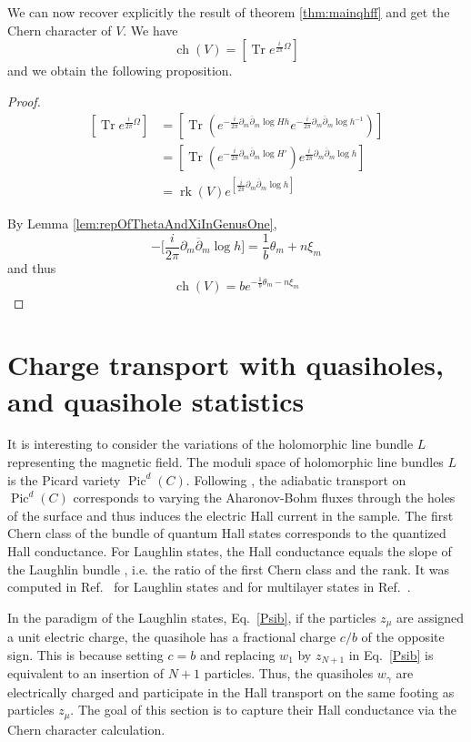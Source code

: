 \documentclass{article}
\theoremstyle{definition}
\DeclareMathOperator{\pic}{\text{Pic}}
\DeclareMathOperator{\ch}{ch}
\DeclareMathOperator{\rk}{rk}
\DeclareMathOperator{\tr}{Tr}
\newcommand{\ov}[1]{\overline{#1}}
\begin{document}
We can now recover explicitly the result of theorem \ref{thm:mainqhff} and get the Chern character of $V$. We have $$\ch(V)=[\tr e^{\frac{i}{2\pi} \Omega}]$$
and we obtain the following proposition.

\propclasschernconnection*

\begin{proof}
\begin{align*}
    \left[ \tr e^{\frac{i}{2\pi} \Omega} \right]&=\left[ \tr \left( e^{-\frac{i}{2\pi}\partial_m \ov{\partial}_m \log Hh} e^{-\frac{i}{2\pi}\partial_m \ov{\partial}_m \log h^{-1}}\right) \right]\\
    &=\left[ \tr \left( e^{-\frac{i}{2\pi}\partial_m \ov{\partial}_m \log H'} \right) e^{\frac{i}{2\pi}\partial_m \ov{\partial}_m \log h}\right]\\
    &=\rk(V) e^{\left[\frac{i}{2\pi} \partial_m \ov{\partial}_m \log h\right] }
 \end{align*}   
    
    By Lemma \ref{lem:repOfThetaAndXiInGenusOne}, $$-\bigg[\frac{i}{2\pi}\partial_m \ov{\partial}_m \log h\bigg]=\frac{1}{b}\theta_m+n\xi_m$$ and thus 
    $$\ch(V)=be^{-\frac{1}{b}\theta_m-n\xi_m}$$
\end{proof}


\section{Charge transport with quasiholes, and quasihole statistics}

 It is interesting to consider the variations of the holomorphic line bundle $L$ representing the magnetic field. The moduli space of holomorphic line bundles $L$ is the Picard variety $\pic^d(C)$. Following \cite{Avron_Seiler_Zograf_1994}, the adiabatic transport on $\pic^d(C)$ corresponds to varying the Aharonov-Bohm fluxes through the holes of the surface and thus induces the electric Hall current in the sample. The first Chern class of the bundle of quantum Hall states corresponds to the quantized Hall conductance. For Laughlin states, the Hall conductance equals the slope of the Laughlin bundle \cite{Klein_Seiler_1990}, i.e. the ratio of the first Chern class and the rank. It was computed in Ref.\ \cite{Klevtsov_Zvonkine_2025} for Laughlin states and for multilayer states in Ref.\ \cite{Aldonza_Dupont_2025}. 

In the paradigm of the Laughlin states, Eq.\ \eqref{Psib}, if the particles $z_\mu$ are assigned a unit electric charge, the quasihole has a fractional charge $c/b$ of the opposite sign. This is because setting $c=b$ and replacing $w_1$ by $z_{N+1}$ in Eq.\ \eqref{Psib} is equivalent to an insertion of $N+1$ particles. Thus, the quasiholes $w_\gamma$ are electrically charged and participate in the Hall transport on the same footing as particles $z_\mu$. The goal of this section is to capture their Hall conductance via the Chern character calculation. 
\end{document}
